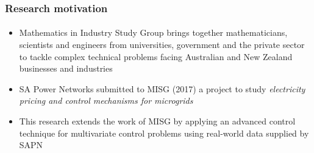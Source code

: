 \documentclass[presentation, smaller, xcolor=table]{beamer}
\begin{document}
\begin{frame}
	\frametitle{Research motivation}
	\framesubtitle{}

	\begin{minipage}{0.52\linewidth}
		\begin{itemize}
			\item  Mathematics in Industry Study Group brings together mathematicians, scientists and engineers from universities, government and the private sector to tackle complex technical problems facing Australian and New Zealand businesses and industries
		
			\item  SA Power Networks submitted to MISG (2017) a project to study \textit{electricity pricing and control mechanisms for microgrids}
		
			\item  This research extends the work of MISG by applying an advanced control technique for multivariate control problems using real-world data supplied by SAPN 
	
		\end{itemize}
	\end{minipage}%
	\begin{minipage}{0.48\linewidth}
	\end{minipage}

\end{frame}
\end{document}
